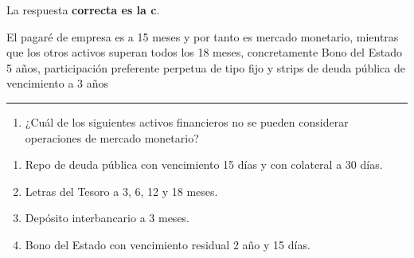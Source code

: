 \documentclass[
  letterpaper,
  DIV=11,
  numbers=noendperiod]{scrreprt}
\providecommand{\tightlist}{%
  \setlength{\itemsep}{0pt}\setlength{\parskip}{0pt}}\usepackage{longtable,booktabs,array}
\begin{document}
\begin{tcolorbox}[enhanced jigsaw, left=2mm, opacityback=0, colback=white, breakable, arc=.35mm, bottomrule=.15mm, rightrule=.15mm, toprule=.15mm, leftrule=.75mm, colframe=quarto-callout-tip-color-frame]
\begin{minipage}[t]{5.5mm}
\textcolor{quarto-callout-tip-color}{\faLightbulb}
\end{minipage}%
\begin{minipage}[t]{\textwidth - 5.5mm}

La respuesta \textbf{correcta es la c}.

El pagaré de empresa es a 15 meses y por tanto es mercado monetario,
mientras que los otros activos superan todos los 18 meses, concretamente
Bono del Estado 5 años, participación preferente perpetua de tipo fijo y
strips de deuda pública de vencimiento a 3 años

\end{minipage}%
\end{tcolorbox}

\begin{center}\rule{0.5\linewidth}{0.5pt}\end{center}

\begin{enumerate}
\def\labelenumi{\arabic{enumi}.}
\setcounter{enumi}{31}
\tightlist
\item
  ¿Cuál de los siguientes activos financieros no se pueden considerar
  operaciones de mercado monetario?
\end{enumerate}

\begin{enumerate}
\def\labelenumi{\alph{enumi})}
\item
  Repo de deuda pública con vencimiento 15 días y con colateral a 30
  días.
\item
  Letras del Tesoro a 3, 6, 12 y 18 meses.
\item
  Depósito interbancario a 3 meses.
\item
  Bono del Estado con vencimiento residual 2 año y 15 días.
\end{enumerate}
\end{document}
